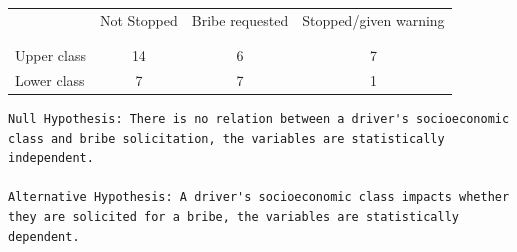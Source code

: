 \documentclass[12pt,letterpaper]{article}
\begin{document}
\newpage
\begin{table}[h!]
	\centering
	\begin{tabular}{l | c c c }
		& Not Stopped & Bribe requested & Stopped/given warning \\
		\\[-1.8ex] 
		\hline \\[-1.8ex]
		Upper class & 14 & 6 & 7 \\
		Lower class & 7 & 7 & 1 \\
		\hline
	\end{tabular}
\end{table}
\begin{Verbatim}
Null Hypothesis: There is no relation between a driver's socioeconomic 
class and bribe solicitation, the variables are statistically independent.

Alternative Hypothesis: A driver's socioeconomic class impacts whether
they are solicited for a bribe, the variables are statistically dependent.
\end{Verbatim}
\end{document}

